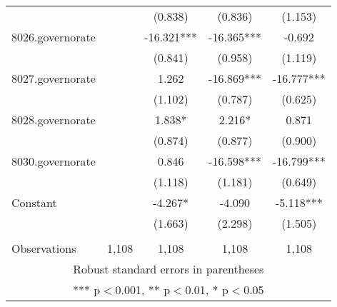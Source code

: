\documentclass[]{article}
\begin{document}
\begin{tabular}{lcccc}
 &  & (0.838) & (0.836) & (1.153) \\
8026.governorate &  & -16.321*** & -16.365*** & -0.692 \\
 &  & (0.841) & (0.958) & (1.119) \\
8027.governorate &  & 1.262 & -16.869*** & -16.777*** \\
 &  & (1.102) & (0.787) & (0.625) \\
8028.governorate &  & 1.838* & 2.216* & 0.871 \\
 &  & (0.874) & (0.877) & (0.900) \\
8030.governorate &  & 0.846 & -16.598*** & -16.799*** \\
 &  & (1.118) & (1.181) & (0.649) \\
Constant &  & -4.267* & -4.090 & -5.118*** \\
 &  & (1.663) & (2.298) & (1.505) \\
 &  &  &  &  \\
 Observations & 1,108 & 1,108 & 1,108 & 1,108 \\ \hline
\multicolumn{5}{c}{ Robust standard errors in parentheses} \\
\multicolumn{5}{c}{ *** p$<$0.001, ** p$<$0.01, * p$<$0.05} \\
\end{tabular}
\end{document}
